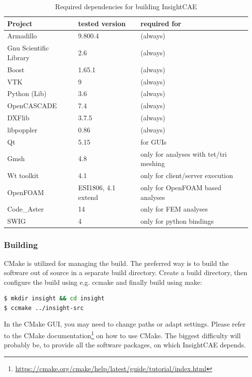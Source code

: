 \begin{table}[h!]
\centering
\begin{tabular}{lll}
\hline
Project & tested version & required for\\
\hline

Armadillo & 9.800.4 & (always)\\
Gnu Scientific Library & 2.6 & (always)\\
Boost & 1.65.1 &(always) \\
VTK & 9 & (always)\\
Python (Lib) & 3.6 & (always)\\
OpenCASCADE & 7.4 & (always)\\
DXFlib & 3.7.5 & (always)\\
libpoppler & 0.86 & (always) \\
Qt & 5.15 & for GUIs\\
Gmsh & 4.8 & only for analyses with tet/tri meshing\\
Wt toolkit & 4.1 & only for client/server execution\\
OpenFOAM & ESI1806, 4.1 extend & only for OpenFOAM based analyses\\
Code\_Aster & 14 & only for FEM analyses \\
SWIG & 4 & only for python bindings \\
\hline
\end{tabular}
\caption{Required dependencies for building InsightCAE}
\label{tab:dependencies}
\end{table}

\subsubsection{Building}


CMake is utilized for managing the build. 
The preferred way is to build the software out of source in a separate build directory. Create a build directory, then configure the build using e.g. ccmake and finally build using make:

\begin{lstlisting}[language=bash]
$ mkdir insight && cd insight
$ ccmake ../insight-src
\end{lstlisting}
In the CMake GUI, you may need to change paths or adapt settings. Please refer to the CMake documentation\footnote{\url{https://cmake.org/cmake/help/latest/guide/tutorial/index.html}} on how to use CMake.
The biggest difficulty will probably be, to provide all the software packages, on which InsightCAE depends.


